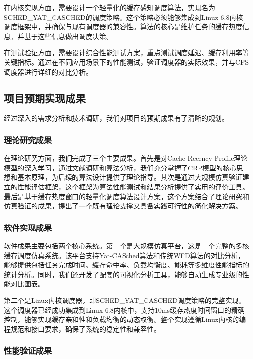 在内核实现方面，需要设计一个轻量化的缓存感知调度算法，实现名为SCHED\_YAT\_CASCHED的调度策略。这个策略必须能够集成到Linux 6.8内核调度框架中，并确保与现有调度器的兼容性。算法的核心是维护任务的缓存热度信息，并基于这些信息做出调度决策。

在测试验证方面，需要设计综合性能测试方案，重点测试调度延迟、缓存利用率等关键指标。通过在不同应用场景下的性能测试，验证调度器的实际效果，并与CFS调度器进行详细的对比分析。

\subsection{项目预期实现成果}

经过深入的需求分析和技术调研，我们对项目的预期成果有了清晰的规划。

\subsubsection{理论研究成果}

在理论研究方面，我们完成了三个主要成果。首先是对Cache Recency Profile理论模型的深入学习，通过文献调研和算法分析，我们充分掌握了CRP模型的核心思想和基本原理，为后续的算法设计提供了理论指导。其次是通过大规模仿真验证建立的性能评估框架，这个框架为算法性能测试和结果分析提供了实用的评价工具。最后是基于缓存热度窗口的轻量化调度算法设计方案，这个方案结合了理论研究和仿真验证的成果，提出了一个既有理论支撑又具备实践可行性的简化解决方案。

\subsubsection{软件实现成果}

软件成果主要包括两个核心系统。第一个是大规模仿真平台，这是一个完整的多核缓存调度仿真系统。该平台支持Yat-CASched算法和传统WFD算法的对比分析，能够提供包括任务完成时间、缓存命中率、负载均衡度、能耗等多维度性能指标的统计分析。同时，我们还开发了配套的可视化分析工具，能够自动生成专业级的性能对比图表。

第二个是Linux内核调度器，即SCHED\_YAT\_CASCHED调度策略的完整实现。这个调度器已经成功集成到Linux 6.8内核中，支持10ms缓存热度时间窗口的精确控制，能够实现缓存亲和性和负载均衡的动态权衡。整个实现遵循Linux内核的编程规范和接口要求，确保了系统的稳定性和兼容性。

\subsubsection{性能验证成果}

